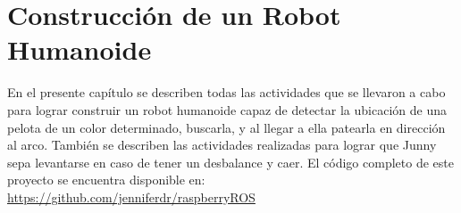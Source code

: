 \chapter{Construcci\'on de un Robot Humanoide}\label{chapter:introAdesarrollo}

En el presente capítulo se describen todas las actividades que se llevaron a cabo para lograr construir un robot humanoide capaz de detectar la ubicación de una pelota de un color determinado, buscarla, y al llegar a ella patearla en direcci\'on al arco. También se describen las actividades realizadas para lograr que Junny sepa levantarse en caso de tener un desbalance y caer.
El c\'odigo completo de este proyecto se encuentra disponible en: \url{ https://github.com/jenniferdr/raspberryROS}     




